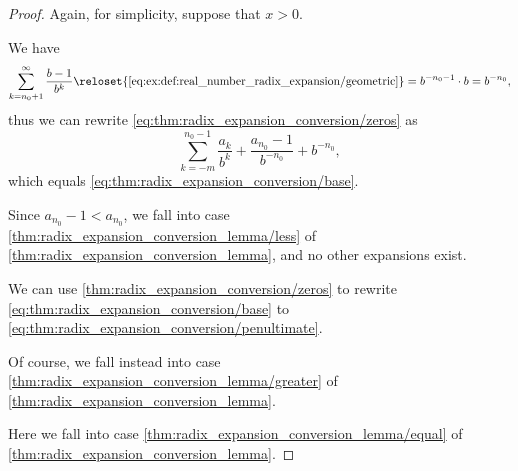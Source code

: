 \begin{proof}
  Again, for simplicity, suppose that \( x > 0 \).


   We have
  \begin{equation*}
    \sum_{k=n_0 + 1}^\infty \frac {b - 1} {b^k}
    \reloset {\eqref{eq:ex:def:real_number_radix_expansion/geometric}} =
    b^{-n_0-1} \cdot b
    =
    b^{-n_0},
  \end{equation*}
  thus we can rewrite \eqref{eq:thm:radix_expansion_conversion/zeros} as
  \begin{equation*}
    \sum_{k=-m}^{n_0 - 1} \frac {a_k} {b^k} + \frac {a_{n_0} - 1} {b^{-n_0}} + b^{-n_0},
  \end{equation*}
  which equals \eqref{eq:thm:radix_expansion_conversion/base}.

   Since \( a_{n_0} - 1 < a_{n_0} \), we fall into case \cref{thm:radix_expansion_conversion_lemma/less} of \cref{thm:radix_expansion_conversion_lemma}, and no other expansions exist.

   We can use \cref{thm:radix_expansion_conversion/zeros} to rewrite \eqref{eq:thm:radix_expansion_conversion/base} to \eqref{eq:thm:radix_expansion_conversion/penultimate}.

  Of course, we fall instead into case \cref{thm:radix_expansion_conversion_lemma/greater} of \cref{thm:radix_expansion_conversion_lemma}.

   Here we fall into case \cref{thm:radix_expansion_conversion_lemma/equal} of \cref{thm:radix_expansion_conversion_lemma}.
\end{proof}

